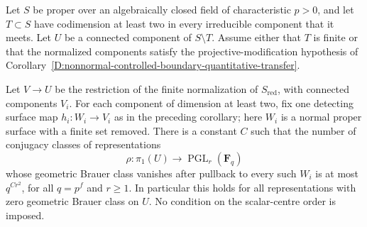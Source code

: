 \begin{corollary}
\label{D:Brauer-zero-normalization-transfer}
Let $S$ be proper over an algebraically closed field of
characteristic $p>0$, and let $T\subset S$ have codimension at
least two in every irreducible component that it meets. Let $U$
be a connected component of $S\setminus T$. Assume either that
$T$ is finite or that the normalized components satisfy the
projective-modification hypothesis of
Corollary~\ref{D:nonnormal-controlled-boundary-quantitative-transfer}.

Let $V\to U$ be the restriction of the finite normalization of
$S_{\mathrm{red}}$, with connected components $V_i$. For each
component of dimension at least two, fix one detecting surface
map $h_i:W_i\to V_i$ as in the preceding corollary; here $W_i$
is a normal proper surface with a finite set removed.
There is a constant $C$ such that the number of conjugacy classes
of representations
\[
                \rho:\pi_1(U)\to
                          \operatorname{PGL}_r(\mathbf F_q)
\]
whose geometric Brauer class vanishes after pullback to every
such $W_i$ is at most $q^{Cr^2}$, for all $q=p^f$ and $r\ge1$.
In particular this holds for all representations with zero
geometric Brauer class on $U$. No condition on the scalar-centre
order is imposed.
\end{corollary}

